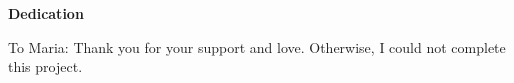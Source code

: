 

\textbf{Dedication}

To Maria: Thank you for your support and love. Otherwise, I could not
complete this project.

\begin{description}
\item[]
\end{description}


